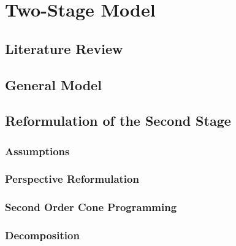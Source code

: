 \chapter{Two-Stage Model}

\section{Literature Review}

\section{General Model}

\section{Reformulation of the Second Stage}
\subsection{Assumptions}
\subsection{Perspective Reformulation}
\subsection{Second Order Cone Programming}
\subsection{Decomposition}



